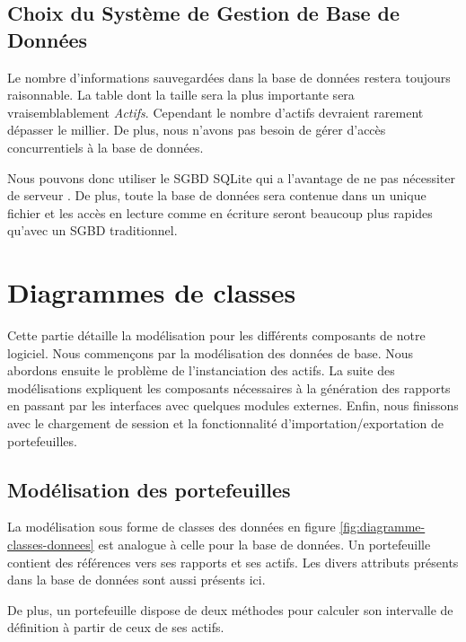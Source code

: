\documentclass[a4paper,titlepage,french]{report}
\begin{document}
\subsection{Choix du Système de Gestion de Base de Données}

Le nombre d'informations sauvegardées dans la base de données restera toujours raisonnable.
La table dont la taille sera la plus importante sera vraisemblablement \textit{Actifs}.
Cependant le nombre d'actifs devraient rarement dépasser le millier.
De plus, nous n'avons pas besoin de gérer d'accès concurrentiels à la base de données.

Nous pouvons donc utiliser le SGBD SQLite qui a l'avantage de ne pas nécessiter de serveur \cite{website:SQLite}.
De plus, toute la base de données sera contenue dans un unique fichier et les accès en lecture comme en écriture seront beaucoup plus rapides qu'avec un SGBD traditionnel.


\section{Diagrammes de classes}

Cette partie détaille la modélisation pour les différents composants de notre logiciel.
Nous commençons par la modélisation des données de base. Nous abordons ensuite le problème de l'instanciation des actifs.
La suite des modélisations expliquent les composants nécessaires à la génération des rapports en passant par les interfaces avec quelques modules externes.
Enfin, nous finissons avec le chargement de session et la fonctionnalité d'importation/exportation de portefeuilles.


\subsection{Modélisation des portefeuilles}

La modélisation sous forme de classes des données en figure \ref{fig:diagramme-classes-donnees} est analogue à celle pour la base de données. Un portefeuille contient des références vers ses rapports et ses actifs. Les divers attributs présents dans la base de données sont aussi présents ici.

De plus, un portefeuille dispose de deux méthodes pour calculer son intervalle de définition à partir de ceux de ses actifs.
\end{document}
